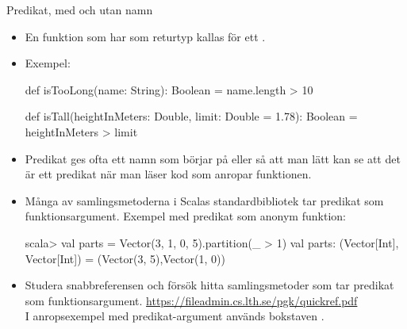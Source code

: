 \begin{Slide}{Predikat, med och utan namn}
\begin{itemize}\SlideFontTiny
\item En funktion som har  som returtyp kallas för ett . 
\item Exempel:
\begin{Code}
def isTooLong(name: String): Boolean = name.length > 10

def isTall(heightInMeters: Double, limit: Double = 1.78): Boolean = 
  heightInMeters > limit
\end{Code}
\item Predikat ges ofta ett namn som börjar på  eller  så att man lätt kan se att det är ett predikat när man läser kod som anropar funktionen.
\item Många av samlingsmetoderna i Scalas standardbibliotek tar predikat som funktionsargument. Exempel med predikat som anonym funktion: 
\begin{REPLnonum}
scala> val parts = Vector(3, 1, 0, 5).partition(_ > 1)
val parts: (Vector[Int], Vector[Int]) = 
  (Vector(3, 5),Vector(1, 0))
\end{REPLnonum} 
\item Studera snabbreferensen och försök hitta samlingsmetoder som tar predikat som funktionsargument. \url{https://fileadmin.cs.lth.se/pgk/quickref.pdf} \\I anropsexempel med predikat-argument används bokstaven .
\end{itemize}  
\end{Slide}

